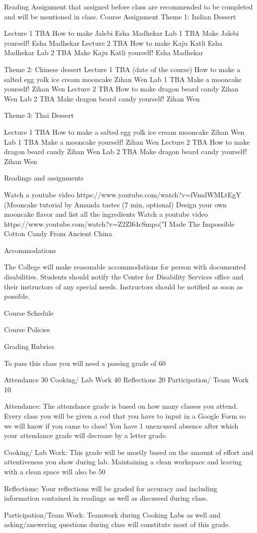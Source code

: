 \documentclass{article}
\begin{document}
Reading Assignment that assigned before class are recommended to be completed and will be mentioned in class.
Course Assignment
Theme 1: Indian Dessert

Lecture 1
TBA
How to make Jalebi 
Esha Madhekar
Lab 1 
TBA
Make Jalebi yourself!
Esha Madhekar
Lecture 2 
TBA
How to make Kaju Katli
Esha Madhekar
Lab 2 
TBA
Make Kaju Katli yourself!
Esha Madhekar

Theme 2: Chinese dessert
Lecture 1
TBA
(date of the course)
How to make a salted egg yolk ice cream mooncake 
Zihan Wen
Lab 1 
TBA
Make a mooncake yourself!
Zihan Wen
Lecture 2
TBA
How to make dragon beard candy
Zihan Wen
Lab 2 
TBA
Make dragon beard candy yourself!
Zihan Wen

Theme 3: Thai Dessert

Lecture 1
TBA
How to make a salted egg yolk ice cream mooncake 
Zihan Wen
Lab 1 
TBA
Make a mooncake yourself!
Zihan Wen
Lecture 2 
TBA
How to make dragon beard candy
Zihan Wen
Lab 2 
TBA
Make dragon beard candy yourself!
Zihan Wen

Readings and assignments

Watch a youtube video https://www.youtube.com/watch?v=fVmdWMLtEgY (Mooncake tutorial by Amanda tastes (7 min, optional)
Design your own mooncake flavor and list all the ingredients 
Watch a youtube video https://www.youtube.com/watch?v=Z2Zl64cSmpo("I Made The Impossible Cotton Candy From Ancient China 

Accommodations 

The College will make reasonable accommodations for person with documented disabilities. Students should notify the Center for Disability Services office and their instructors of any special needs. Instructors should be notified as soon as possible.

Course Schedule

Course Policies

Grading Rubrics 

To pass this class you will need a passing grade of 60%
   
Attendance
30%
Cooking/ Lab Work
40%
Reflections
20%
Participation/ Team Work
10%
 
Attendance: The attendance grade is based on how many classes you attend. Every class you will be given a cod that you have to input in a Google Form so we will know if you came to class! You have 1 unexcused absence after which  your attendance grade will decrease by a letter grade.

Cooking/ Lab Work: This grade will be mostly based on the amount of effort and attentiveness you show during lab. Maintaining a clean workspace and leaving with a clean space will also be 50%

Reflections: Your reflections will be graded for accuracy and including information contained in readings as well as discussed during class.

Participation/Team Work: Teamwork during Cooking Labs as well and asking/answering questions during class will constitute most of this grade.
\end{document}
